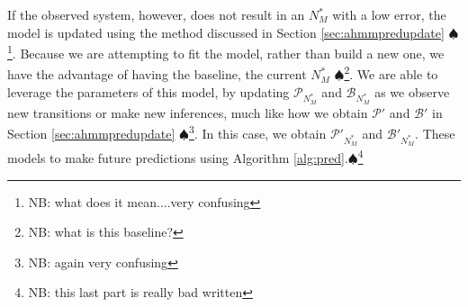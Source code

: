 \documentclass[letterpaper, 10 pt, conference]{ieeeconf}  %
\newcommand\NB[1]{$\spadesuit$\footnote{NB: #1}}
\begin{document}
If the observed system, however, does not result in an $N_M^*$ with a low error, the model is updated using the method discussed in Section \ref{sec:ahmmpredupdate} \NB{what does it mean....very confusing}. Because we are attempting to fit the model, rather than build a new one, we have the advantage of having the baseline, the current $N_M^*$ \NB{what is this baseline?}. We are able to leverage the parameters of this model, by  updating $\mathcal{P}_{N_M^*}$ and $\mathcal{B}_{N_M^*}$ as we observe new transitions or make new inferences, much like how we obtain $\mathcal{P}'$ and $\mathcal{B}'$ in Section \ref{sec:ahmmpredupdate} \NB{again very confusing}. In this case, we obtain $\mathcal{P}'_{N_M^*}$ and $\mathcal{B}'_{N_M^*}$. These models to make future predictions using Algorithm \ref{alg:pred}.\NB{this last part is really bad written}

\end{document}
